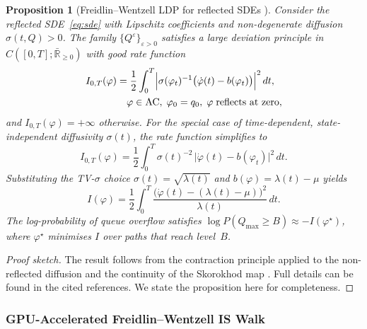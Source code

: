 \documentclass{ieeeaccess}
\newtheorem{proposition}{Proposition}
\begin{document}
\begin{proposition}[Freidlin--Wentzell LDP for reflected SDEs {\cite{dupuis1997large,anderson1976small}}]
\label{prop:rate_function}
Consider the reflected SDE~\eqref{eq:sde} with Lipschitz coefficients and non-degenerate
diffusion $\sigma(t,Q)>0$. The family $\{Q^\varepsilon\}_{\varepsilon>0}$ satisfies a large
deviation principle in $C([0,T];\bar{\mathbb{R}}_{\geq0})$ with good rate function
\begin{equation}
\begin{aligned}
    I_{0,T}(\varphi) &= \frac{1}{2}\int_0^T
    \Bigl|\sigma(\varphi_t)^{-1}\bigl(\dot\varphi(t)-b(\varphi_t)\bigr)\Bigr|^2\,dt,\\
    &\quad \varphi\in\mathrm{AC},\;\varphi_0=q_0,\;\varphi\;\text{reflects at zero},
\end{aligned}
    \label{eq:rate_general}
\end{equation}
and $I_{0,T}(\varphi)=+\infty$ otherwise. For the special case of time-dependent,
state-independent diffusivity $\sigma(t)$, the rate function simplifies to
\begin{equation}
    I_{0,T}(\varphi) = \frac{1}{2}\int_0^T
    \sigma(t)^{-2}\,\bigl|\dot\varphi(t)-b(\varphi_t)\bigr|^2\,dt .
    \label{eq:rate_si}
\end{equation}
Substituting the TV-$\sigma$ choice $\sigma(t)=\sqrt{\lambda(t)}$ and
$b(\varphi)=\lambda(t)-\mu$ yields
\begin{equation}
    I(\varphi) = \frac{1}{2}\int_0^T
    \frac{\bigl(\dot\varphi(t)-(\lambda(t)-\mu)\bigr)^2}{\lambda(t)}\,dt .
    \label{eq:rate_function}
\end{equation}
The log-probability of queue overflow satisfies
$\log P(Q_{\max}\geq B)\approx -I(\varphi^\star)$, where $\varphi^\star$ minimises $I$ over
paths that reach level~$B$.
\end{proposition}
\begin{proof}[Proof sketch]
The result follows from the contraction principle applied to the non-reflected diffusion
and the continuity of the Skorokhod map \cite{anderson1976small,dupuis1997large,kushner2010numerical,lions1984stochastic,tanaka1979stochastic}.
Full details can be found in the cited references.  We state the proposition here for
completeness.
\end{proof}

\subsubsection{GPU-Accelerated Freidlin--Wentzell IS Walk}
\label{subsubsec:is_walk}
\end{document}
